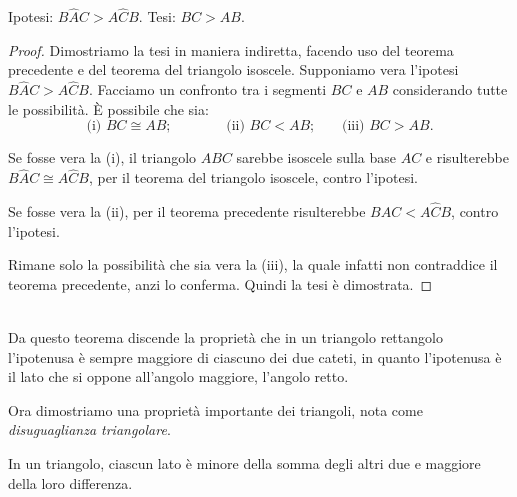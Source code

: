 \noindent\begin{minipage}{0.7\textwidth}\parindent15pt 
	\noindent Ipotesi: $B\widehat{A}C>A\widehat{C}B$. Tesi: $BC>AB$.
	
	\noindent\begin{proof}
		\noindent Dimostriamo la tesi in maniera indiretta, facendo uso del 
		teorema precedente e del teorema del triangolo isoscele. Supponiamo 
		vera l'ipotesi $B\widehat{A}C>A\widehat{C}B$. Facciamo un confronto 
		tra i segmenti $BC$ e $AB$ considerando tutte le possibilità. \`E 
		possibile che sia:
		\[\text{(i) }BC\cong AB\text{;}\qquad\qquad \text{(ii) 
		}BC<AB\text{;}\quad\quad\text{(iii) }BC>AB\text{.}\]
		
		Se fosse vera la (i), il triangolo $ABC$ sarebbe isoscele sulla base 
		$AC$ e risulterebbe $B\widehat{A}C\cong A\widehat{C}B$, per il 
		teorema del triangolo isoscele, contro l'ipotesi.
		
		Se fosse vera la (ii), per il teorema precedente risulterebbe 
		$B\widehat{A}C<A\widehat{C}B$, contro l'ipotesi.
		
		Rimane solo la possibilità che sia vera la (iii), la quale infatti 
		non contraddice il teorema precedente, anzi lo conferma. Quindi la 
		tesi è dimostrata.
	\end{proof}
\end{minipage}\hfil
\begin{minipage}{0.3\textwidth}
	\centering
\end{minipage}
~\\

Da questo teorema discende la proprietà che in un triangolo 
rettangolo l'ipotenusa è sempre maggiore di ciascuno dei due cateti, 
in quanto l'ipotenusa è il lato che si oppone all'angolo maggiore, 
l'angolo retto.

Ora dimostriamo una proprietà importante dei triangoli, nota come 
\emph{disuguaglianza triangolare}.

\begin{teorema}
	In un triangolo, ciascun lato è minore della somma degli altri due e 
	maggiore della loro differenza.
\end{teorema}

